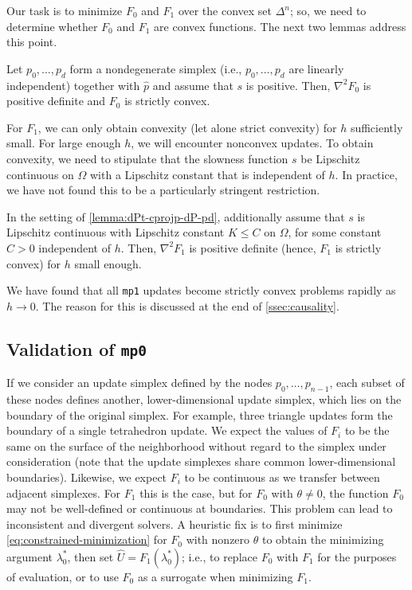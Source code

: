\documentclass{article}
\begin{document}
Our task is to minimize $F_0$ and $F_1$ over the convex set
$\Delta^n$; so, we need to determine whether $F_0$ and $F_1$ are
convex functions. The next two lemmas address this point.

\begin{lemma}\label{lemma:dPt-cprojp-dP-pd}
  Let $p_0, \hdots, p_d$ form a nondegenerate simplex (i.e.,
  $p_0, \hdots, p_d$ are linearly independent) together with $\hat{p}$
  and assume that $s$ is positive. Then, $\nabla^2 F_0$ is positive
  definite and $F_0$ is strictly convex.
\end{lemma}

For $F_1$, we can only obtain convexity (let alone strict convexity)
for $h$ sufficiently small. For large enough $h$, we will encounter
nonconvex updates. To obtain convexity, we need to stipulate that the
slowness function $s$ be Lipschitz continuous on $\Omega$ with a
Lipschitz constant that is independent of $h$. In practice, we have
not found this to be a particularly stringent restriction.

\begin{lemma}\label{lemma:F-strictly-convex}
  In the setting of \cref{lemma:dPt-cprojp-dP-pd}, additionally assume
  that $s$ is Lipschitz continuous with Lipschitz constant $K \leq C$
  on $\Omega$, for some constant $C > 0$ independent of $h$. Then,
  $\nabla^2 F_1$ is positive definite (hence, $F_1$ is strictly
  convex) for $h$ small enough.
\end{lemma}

We have found that all \texttt{mp1} updates become strictly convex
problems rapidly as $h \to 0$. The reason for this is discussed at the
end of \cref{ssec:causality}.

\subsection{Validation of \texttt{mp0}}\label{ssec:validation}

If we consider an update simplex defined by the nodes
$p_0, \hdots, p_{n-1}$, each subset of these nodes defines another,
lower-dimensional update simplex, which lies on the boundary of the
original simplex. For example, three triangle updates form the
boundary of a single tetrahedron update. We expect the values of $F_i$
to be the same on the surface of the neighborhood without regard to
the simplex under consideration (note that the update simplexes share
common lower-dimensional boundaries). Likewise, we expect $F_i$ to be
continuous as we transfer between adjacent simplexes. For $F_1$ this
is the case, but for $F_0$ with $\theta \neq 0$, the function $F_0$
may not be well-defined or continuous at boundaries. This problem can
lead to inconsistent and divergent solvers. A heuristic fix is to
first minimize \cref{eq:constrained-minimization} for $F_0$ with
nonzero $\theta$ to obtain the minimizing argument $\lambda^*_0$, then
set $\hat{U} = F_1(\lambda_0^*)$; i.e., to replace $F_0$ with $F_1$
for the purposes of evaluation, or to use $F_0$ as a surrogate when
minimizing $F_1$.
\end{document}
